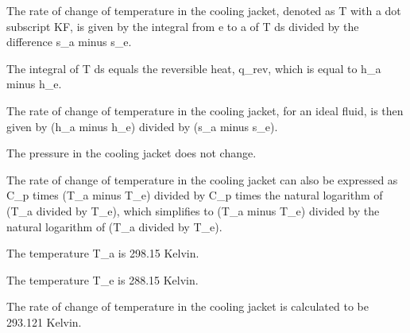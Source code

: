 The rate of change of temperature in the cooling jacket, denoted as T with a dot subscript KF, is given by the integral from e to a of T ds divided by the difference s_a minus s_e.

The integral of T ds equals the reversible heat, q_rev, which is equal to h_a minus h_e.

The rate of change of temperature in the cooling jacket, for an ideal fluid, is then given by (h_a minus h_e) divided by (s_a minus s_e).

The pressure in the cooling jacket does not change.

The rate of change of temperature in the cooling jacket can also be expressed as C_p times (T_a minus T_e) divided by C_p times the natural logarithm of (T_a divided by T_e), which simplifies to (T_a minus T_e) divided by the natural logarithm of (T_a divided by T_e).

The temperature T_a is 298.15 Kelvin.

The temperature T_e is 288.15 Kelvin.

The rate of change of temperature in the cooling jacket is calculated to be 293.121 Kelvin.